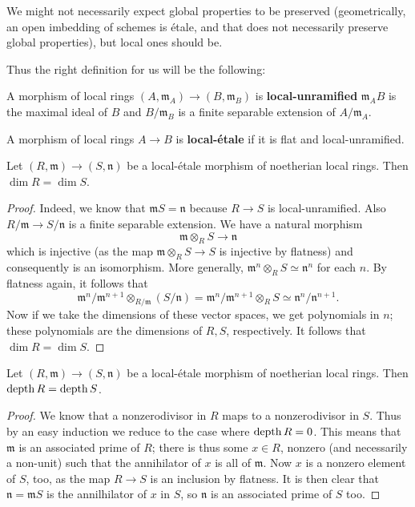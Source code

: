 We might not necessarily expect global properties to be preserved
(geometrically, an open imbedding of schemes is \'etale, and that does
not necessarily preserve global properties), but local ones should be.

Thus the right definition for us will be the following:
\begin{definition} 
A morphism of local rings $(A, \mathfrak{m}_A) \to (B, \mathfrak{m}_B)$ is \textbf{local-unramified}
$\mathfrak{m}_A B$ is the maximal ideal of $B$ and $B/\mathfrak{m}_B$ is a
finite separable extension of $A/\mathfrak{m}_A$.

A morphism of local rings $A \to B$ is \textbf{local-\'etale} if it is flat
and local-unramified.
\end{definition} 



\begin{proposition}  \label{dimpreserved}
Let $(R, \mathfrak{m}) \to (S, \mathfrak{n})$ be a local-\'etale morphism of noetherian local
rings. Then $\dim R = \dim S$. 
\end{proposition} 
\begin{proof} 
Indeed, we know that $\mathfrak{m}S = \mathfrak{n}$ because $R \to S$ is
local-unramified.
Also $R/\mathfrak{m}\to S/\mathfrak{n}$ is a finite separable extension.
We have a natural morphism
\[ \mathfrak{m} \otimes_R S \to \mathfrak{n}  \]
which is injective (as the map $\mathfrak{m} \otimes_R S \to S$ is injective by
flatness) and consequently is an isomorphism.
More generally, $\mathfrak{m}^n \otimes_R S \simeq \mathfrak{n}^n$ for each $n$.
By flatness again, it follows that
\begin{equation} \label{thisiso} \mathfrak{m}^n/\mathfrak{m}^{n+1} \otimes_{R/\mathfrak{m}}
(S/\mathfrak{n}) =  \mathfrak{m}^n/\mathfrak{m}^{n+1} \otimes_R S \simeq
\mathfrak{n}^n/\mathfrak{n}^{n+1}. \end{equation}
Now if we take the dimensions of these vector spaces, we get polynomials in
$n$; these polynomials are the dimensions of $R, S$, respectively. It follows
that $\dim R = \dim S$.
\end{proof} 



\begin{proposition} \label{depthpreserved}
Let $(R, \mathfrak{m}) \to (S, \mathfrak{n})$ be a local-\'etale morphism of noetherian local
rings. 
Then $\operatorname{depth} R = \operatorname{depth} S$.
\end{proposition} 
\begin{proof} 
We know that a nonzerodivisor in $R$ maps to a nonzerodivisor in $S$. Thus by
an easy induction we reduce to the case where $\operatorname{depth} R = 0$. 
This means that $\mathfrak{m}$ is an associated prime of $R$; there is thus
some $x \in R$, nonzero (and necessarily a non-unit) such that the annihilator
of $x$ is all of $\mathfrak{m}$. Now $x$ is a nonzero element of $S$, too, as
the map $R \to S$ is an inclusion by flatness. 
It is then clear that $\mathfrak{n} = \mathfrak{m}S$ is the annilhilator of
$x$ in $S$, so $\mathfrak{n}$ is an associated prime of $S$ too.
\end{proof} 

